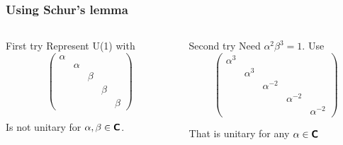 \documentclass[english, fleqn]{beamer}
\begin{document}
\begin{frame}
    \frametitle{Using Schur's lemma}

    \begin{columns}[t]
        \begin{column}{.5\textwidth}
            \begin{block}{First try}
                Represent U(1) with
                \[
                    \begin{pmatrix}
                        \alpha &&&& \\
                        & \alpha &&& \\
                        && \beta && \\
                        &&& \beta & \\
                        &&&& \beta
                    \end{pmatrix}
                \]

                Is not unitary for $\alpha, \beta \in \text{\bfseries\sffamily{C}}$.
            \end{block}
        \end{column}
        \begin{column}{.5\textwidth}
            \begin{block}{Second try}
                Need $\alpha^2 \beta^3 = 1$. Use
                \[
                    \begin{pmatrix}
                        \alpha^3 &&&& \\
                        & \alpha^3 &&& \\
                        && \alpha^{-2} && \\
                        &&& \alpha^{-2} & \\
                        &&&& \alpha^{-2}
                    \end{pmatrix}
                \]
                
                That is unitary for any $\alpha \in \text{\bfseries\sffamily{C}}$
            \end{block}
        \end{column}
    \end{columns}
\end{frame}
\end{document}
